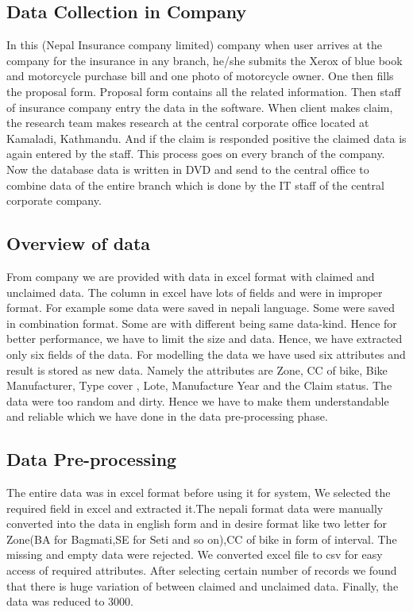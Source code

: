 \subsection{Data Collection in Company}
In this (Nepal Insurance company limited) company when user arrives at the company for the insurance in any branch, he/she submits the Xerox of blue book and motorcycle purchase bill and one photo of motorcycle owner. One then fills the proposal form. Proposal form contains all the related information. Then staff of insurance company entry the data in the software. When client makes claim, the research team makes research at the central corporate office located at Kamaladi, Kathmandu. And if the claim is responded positive the claimed data is again entered by the staff. This process goes on every branch of the company. Now the database data is written in DVD and send to the central office to combine data of the entire branch which is done by the IT staff of the central corporate company.

\subsection{Overview of data}
From company we are provided with data in excel format with claimed and unclaimed data. The column in excel have lots of fields and were in improper format. For example some data were saved in nepali language. Some were saved in combination format. Some are with different being same data-kind.  Hence for better performance, we have to limit the size and data. Hence, we have extracted only six fields of the data. For modelling the data we have used six attributes and result is stored as new data. Namely the attributes are Zone, CC of bike, Bike Manufacturer, Type cover , Lote, Manufacture Year and the Claim status. The data were too random and dirty. Hence we have to make them understandable and reliable which we have done in the data pre-processing phase.
\subsection{Data Pre-processing}
The entire data was in excel format before using it for system, We selected the required field in excel and extracted it.The nepali format data were manually converted into the data in english form and in desire format like two letter for Zone(BA for Bagmati,SE for Seti and so on),CC of bike in form of interval. The missing and empty data were rejected. We converted excel file to \acs{csv} for easy access of required attributes. After selecting certain number of records we found that there is huge variation of between claimed and unclaimed data. Finally, the data was reduced to 3000.
